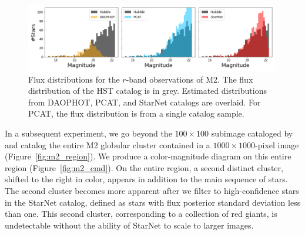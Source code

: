 \begin{figure}[tb]
    \centering
    \includegraphics[width=0.99\textwidth]{figures/m2_results/luminosity_fun.png}
    \caption{Flux distributions for the $r$-band observations of M2.
    The flux distribution of the HST catalog is in grey.
    Estimated distributions from DAOPHOT, PCAT, and StarNet catalogs are overlaid.
    For PCAT, the flux distribution is from a single catalog sample. }
    \label{fig:luminosity_fun_m2}
\end{figure}




In a subsequent experiment, 
we go beyond the $100\times100$ subimage
cataloged by \cite{Feder_2019} and 
catalog the entire M2 globular cluster 
contained in a $1000 \times 1000$-pixel image (Figure~\ref{fig:m2_region}). 
We produce a color-magnitude diagram on this entire region (Figure~\ref{fig:m2_cmd}). 
On the entire region, a second distinct cluster, 
shifted to the right in color, 
appears in addition to the main sequence of stars.
The second cluster becomes more apparent after we filter to high-confidence stars in the StarNet catalog, 
defined as stars with flux posterior standard deviation less than one. 
This second cluster, corresponding to a collection of red giants, 
is undetectable without the ability of StarNet to 
scale to larger images. 

